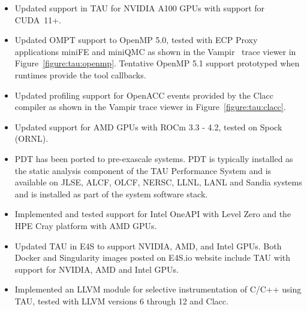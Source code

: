 \begin{itemize}
\item %
Updated support in TAU for NVIDIA A100 GPUs with support for CUDA~11+.

\item %
Updated OMPT support to OpenMP 5.0, tested with ECP Proxy applications miniFE and miniQMC as shown in the Vampir~\cite{vampir.eu} trace viewer in Figure~\ref{figure:tau:openmp}.  Tentative OpenMP 5.1 support prototyped when runtimes provide the tool callbacks.

\item %
Updated profiling support for OpenACC events provided by the Clacc compiler as shown in the Vampir trace viewer in Figure~\ref{figure:tau:clacc}.

\item %
Updated support for AMD GPUs with ROCm 3.3 - 4.2, tested on Spock (ORNL).

\item %
PDT has been ported to pre-exascale systems.  PDT is
typically installed as the static analysis component of the TAU Performance
System and is available on JLSE, ALCF, OLCF, NERSC, LLNL, LANL and Sandia
systems and is installed as part of the system software stack.


\item %
Implemented and tested support for Intel OneAPI with Level Zero and the HPE Cray platform with AMD GPUs.

\item %
Updated TAU in E4S to support NVIDIA, AMD, and Intel GPUs. Both Docker and Singularity images posted on E4S.io website include TAU with support for NVIDIA, AMD and Intel GPUs.


\item %
Implemented an LLVM module for selective instrumentation of C/C++ using TAU, tested with LLVM versions 6 through 12 and Clacc.


\end{itemize}
